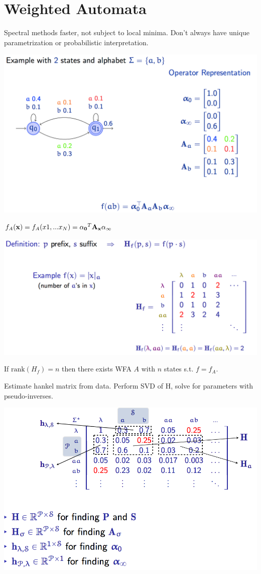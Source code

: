 \section{Weighted Automata}
Spectral methods faster, not subject to local minima. Don't always have unique parametrization or probabilistic interpretation. 

\includegraphics[width=\linewidth]{wfa.png}

$f_{A}(\mathbf{x}) = f_{A}(x1, ... x_N) = \mathbf{\alpha_0}^T\mathbf{A_x}\alpha_{\infty}$

\includegraphics[width=\linewidth]{hankel.png}

If $\text{rank}(H_f) = n$ then there exists WFA $A$ with $n$ states s.t. $f = f_A$.

Estimate hankel matrix from data. Perform SVD of H, solve for parameters with pseudo-inverses. 

\includegraphics[width=\linewidth]{hankel2.png}

